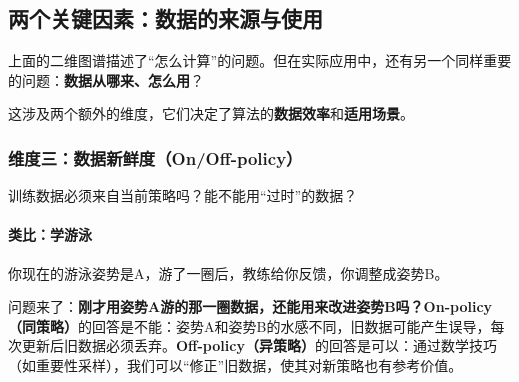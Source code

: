 \subsection{两个关键因素：数据的来源与使用}

上面的二维图谱描述了“怎么计算”的问题。但在实际应用中，还有另一个同样重要的问题：\textbf{数据从哪来、怎么用}？

这涉及两个额外的维度，它们决定了算法的\textbf{数据效率}和\textbf{适用场景}。

\subsubsection{维度三：数据新鲜度（On/Off-policy）}

\begin{keyidea}[核心问题]
训练数据必须来自当前策略吗？能不能用“过时”的数据？
\end{keyidea}

\paragraph{类比：学游泳}

你现在的游泳姿势是A，游了一圈后，教练给你反馈，你调整成姿势B。

问题来了：\textbf{刚才用姿势A游的那一圈数据，还能用来改进姿势B吗？}\textbf{On-policy（同策略）}的回答是不能：姿势A和姿势B的水感不同，旧数据可能产生误导，每次更新后旧数据必须丢弃。\textbf{Off-policy（异策略）}的回答是可以：通过数学技巧（如重要性采样），我们可以“修正”旧数据，使其对新策略也有参考价值。

